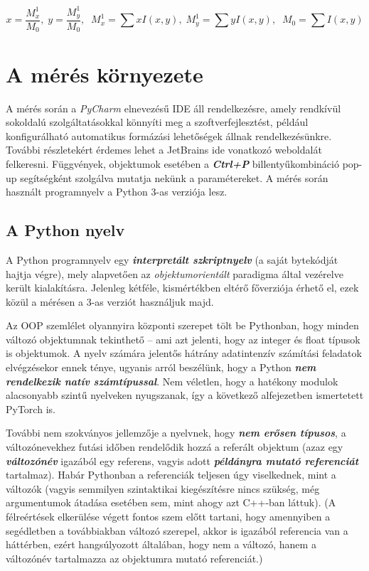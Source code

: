 \documentclass[12pt,a4paper,oneside]{report}             %
\begin{document}
\begin{equation}
	x=\frac{M_x^1}{M_0}, \; y=\frac{M_y^1}{M_0},  \; \; M_x^1=\sum x I(x,y), \;  M_y^1=\sum y I(x,y), \; \; M_0=\sum I(x,y) 
\end{equation}


\chapter{A mérés környezete}

A mérés során a \emph{PyCharm} elnevezésű IDE áll rendelkezésre, amely rendkívül sokoldalú szolgáltatásokkal könnyíti meg a szoftverfejlesztést, például konfigurálható automatikus formázási lehetőségek állnak rendelkezésünkre. További részletekért érdemes lehet a JetBrains ide vonatkozó weboldalát~\cite{pycharm} felkeresni. Függvények, objektumok esetében a \textbf{\textit{Ctrl+P}} billentyűkombináció pop-up segítségként szolgálva mutatja nekünk a paramétereket. A mérés során használt programnyelv a Python 3-as verziója lesz.

\section{A Python nyelv}

A Python programnyelv egy \textbf{\textit{interpretált szkriptnyelv}} (a saját bytekódját hajtja végre), mely alapvetően az \emph{objektumorientált} paradigma által vezérelve került kialakításra. Jelenleg kétféle, kismértékben eltérő főverziója érhető el, ezek közül a mérésen a 3-as verziót használjuk majd.

Az OOP szemlélet olyannyira központi szerepet tölt be Pythonban, hogy minden változó objektumnak tekinthető – ami azt jelenti, hogy az integer és float típusok is objektumok. A nyelv számára jelentős hátrány adatintenzív számítási feladatok elvégzésekor ennek ténye, ugyanis arról beszélünk, hogy a Python \textbf{\textit{nem rendelkezik natív számtípussal}}. Nem véletlen, hogy a hatékony modulok alacsonyabb szintű nyelveken nyugszanak, így a következő alfejezetben ismertetett PyTorch is.

További nem szokványos jellemzője a nyelvnek, hogy \textbf{\textit{nem erősen típusos}}, a változónevekhez futási időben rendelődik hozzá a referált objektum (azaz egy \textbf{\textit{változónév}} igazából egy referens, vagyis adott \textbf{\textit{példányra mutató referenciát}} tartalmaz). Habár Pythonban a referenciák teljesen úgy viselkednek, mint a változók (vagyis semmilyen szintaktikai kiegészítésre nincs szükség, még argumentumok átadása esetében sem, mint ahogy azt C++-ban láttuk). (A félreértések elkerülése végett fontos szem előtt tartani, hogy amennyiben a segédletben a továbbiakban változó szerepel, akkor is igazából referencia van a háttérben, ezért hangsúlyozott általában, hogy nem a változó, hanem a változónév tartalmazza az objektumra mutató referenciát.)
\end{document}
